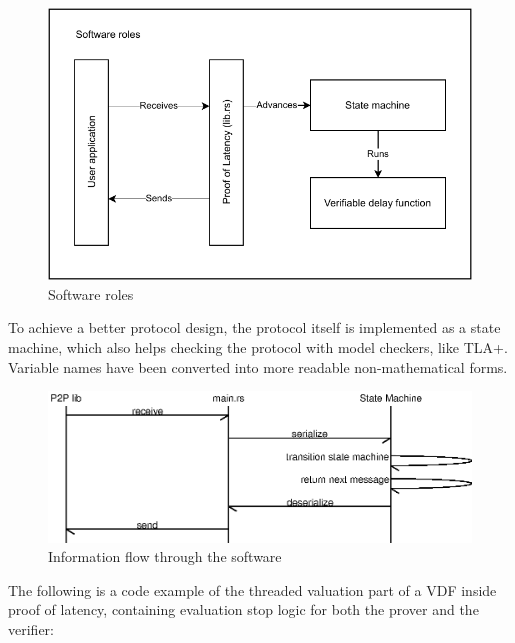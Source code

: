 \begin{figure}
	\includegraphics[width=\textwidth]{pictures/PoL_software_roles.pdf}
	\caption{Software roles}
	\label{software_roles}
\end{figure}


% 

To achieve a better protocol design, the protocol itself is implemented as a state machine, which also helps checking the protocol with model checkers, like TLA+. Variable names have been converted into more readable non-mathematical forms.

\begin{figure}
	\includegraphics[width=\textwidth]{pictures/message_flow.eps}
	\caption{Information flow through the software}
	\label{message_flow}
\end{figure}

The following is a code example of the threaded valuation part of a VDF inside proof of latency, containing evaluation stop logic for both the prover and the verifier:


